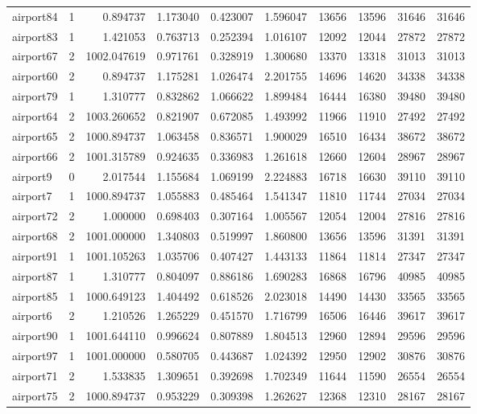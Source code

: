 \begin{longtable}{|l|r|r|r|r|r|r|r|r|r|}
airport84 & 1 & 0.894737 & 1.173040 & 0.423007 & 1.596047 & 13656 & 13596 & 31646 & 31646 \\
airport83 & 1 & 1.421053 & 0.763713 & 0.252394 & 1.016107 & 12092 & 12044 & 27872 & 27872 \\
airport67 & 2 & 1002.047619 & 0.971761 & 0.328919 & 1.300680 & 13370 & 13318 & 31013 & 31013 \\
airport60 & 2 & 0.894737 & 1.175281 & 1.026474 & 2.201755 & 14696 & 14620 & 34338 & 34338 \\
airport79 & 1 & 1.310777 & 0.832862 & 1.066622 & 1.899484 & 16444 & 16380 & 39480 & 39480 \\
airport64 & 2 & 1003.260652 & 0.821907 & 0.672085 & 1.493992 & 11966 & 11910 & 27492 & 27492 \\
airport65 & 2 & 1000.894737 & 1.063458 & 0.836571 & 1.900029 & 16510 & 16434 & 38672 & 38672 \\
airport66 & 2 & 1001.315789 & 0.924635 & 0.336983 & 1.261618 & 12660 & 12604 & 28967 & 28967 \\
airport9 & 0 & 2.017544 & 1.155684 & 1.069199 & 2.224883 & 16718 & 16630 & 39110 & 39110 \\
airport7 & 1 & 1000.894737 & 1.055883 & 0.485464 & 1.541347 & 11810 & 11744 & 27034 & 27034 \\
airport72 & 2 & 1.000000 & 0.698403 & 0.307164 & 1.005567 & 12054 & 12004 & 27816 & 27816 \\
airport68 & 2 & 1001.000000 & 1.340803 & 0.519997 & 1.860800 & 13656 & 13596 & 31391 & 31391 \\
airport91 & 1 & 1001.105263 & 1.035706 & 0.407427 & 1.443133 & 11864 & 11814 & 27347 & 27347 \\
airport87 & 1 & 1.310777 & 0.804097 & 0.886186 & 1.690283 & 16868 & 16796 & 40985 & 40985 \\
airport85 & 1 & 1000.649123 & 1.404492 & 0.618526 & 2.023018 & 14490 & 14430 & 33565 & 33565 \\
airport6 & 2 & 1.210526 & 1.265229 & 0.451570 & 1.716799 & 16506 & 16446 & 39617 & 39617 \\
airport90 & 1 & 1001.644110 & 0.996624 & 0.807889 & 1.804513 & 12960 & 12894 & 29596 & 29596 \\
airport97 & 1 & 1001.000000 & 0.580705 & 0.443687 & 1.024392 & 12950 & 12902 & 30876 & 30876 \\
airport71 & 2 & 1.533835 & 1.309651 & 0.392698 & 1.702349 & 11644 & 11590 & 26554 & 26554 \\
airport75 & 2 & 1000.894737 & 0.953229 & 0.309398 & 1.262627 & 12368 & 12310 & 28167 & 28167 \\

\end{longtable}
